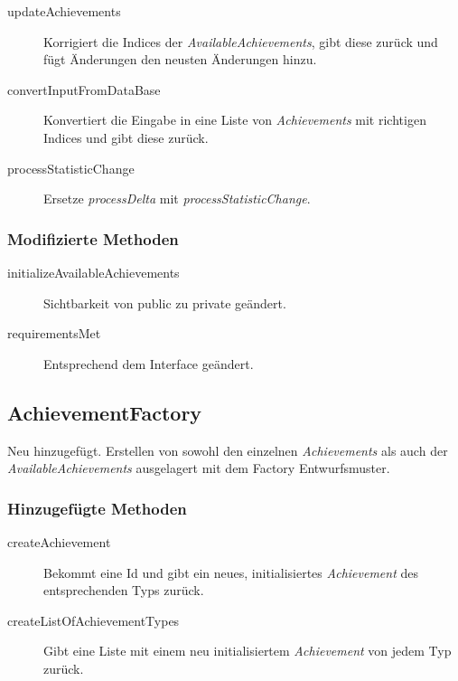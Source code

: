 \begin{description}
	\item[updateAchievements]
	Korrigiert die Indices der \emph{AvailableAchievements}, gibt diese zurück und fügt Änderungen den neusten Änderungen hinzu.	
	
	\item[convertInputFromDataBase]
	Konvertiert die Eingabe in eine Liste von \emph{Achievements} mit richtigen Indices und gibt diese zurück.

	\item[processStatisticChange]
	Ersetze \emph{processDelta} mit \emph{processStatisticChange}.
	
\end{description}



\subsubsection{Modifizierte Methoden}

\begin{description}
	\item[initializeAvailableAchievements]
	Sichtbarkeit von public zu private geändert.
	
	\item[requirementsMet]
	Entsprechend dem Interface geändert.	
\end{description}



\subsection{AchievementFactory}
Neu hinzugefügt.
Erstellen von sowohl den einzelnen \emph{Achievements} als auch der \emph{AvailableAchievements} ausgelagert mit dem Factory Entwurfsmuster.

\subsubsection{Hinzugefügte Methoden}

\begin{description}
	\item[createAchievement]
	Bekommt eine Id und gibt ein neues, initialisiertes \emph{Achievement} des entsprechenden Typs zurück.

	\item[createListOfAchievementTypes]
	Gibt eine Liste mit einem neu initialisiertem \emph{Achievement} von jedem Typ zurück.

\end{description}


